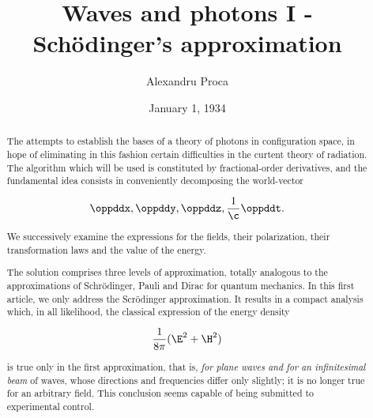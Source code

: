 \documentclass{article}
\author{Alexandru Proca}
\date{January 1, 1934}
\title{Waves and photons I - Schödinger's approximation}
\newcommand{\uequ}[1]{
\begin{equation*}
#1
\end{equation*}
}
\newcommand{\inv}[1]{\frac{1}{#1}}
\renewcommand{\it}[1]{\textit{#1}}
\begin{document}
\maketitle

\begin{abstract}
The attempts to establish the bases of a theory of photons in configuration space, in hope of eliminating in this fashion certain difficulties in the curtent theory of radiation. The algorithm which will be used is constituted by fractional-order derivatives, and the fundamental idea consists in conveniently decomposing the world-vector
\uequ{
\oppddx, \oppddy, \oppddz, \inv{\c}\oppddt.
}

We successively examine the expressions for the fields, their polarization, their transformation laws and the value of the energy.

The solution comprises three levels of approximation, totally analogous to the approximations of Schrödinger, Pauli and Dirac for quantum mechanics. In this first article, we only address the Scrödinger approximation. It results in a compact analysis which, in all likelihood, the classical expression of the energy density
\uequ{
\inv{8\pi}(\E^2+\H^2)
}
is true only in the first approximation, that is, \it{for plane waves and for an infinitesimal beam} of waves, whose directions and frequencies differ only slightly; it is no longer true for an arbitrary field. This conclusion seems capable of being submitted to experimental control.
\end{abstract}
\end{document}
